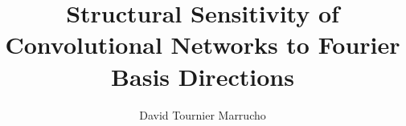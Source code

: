 \documentclass[11pt,a4paper,oneside]{report}
\title{Structural Sensitivity of Convolutional Networks to Fourier Basis Directions}
\author{David Tournier Marrucho}
\begin{document}
\maketitle

\tableofcontents
\newpage

\onehalfspacing







% 

\appendix






\end{document}
